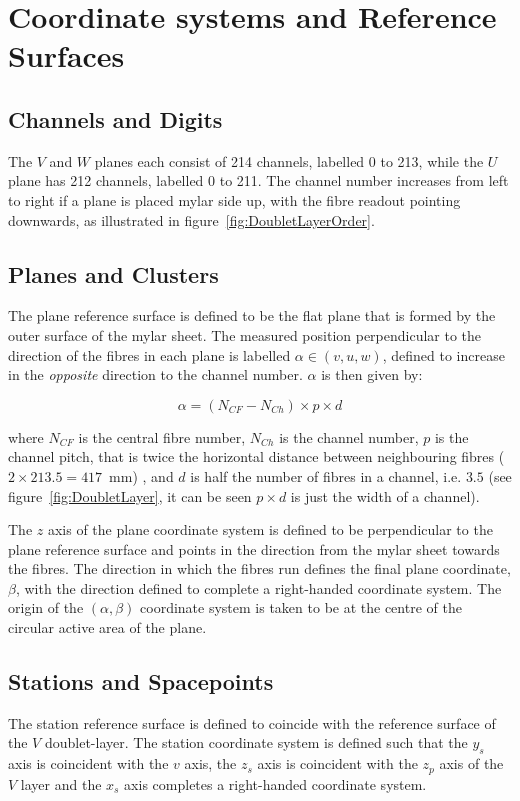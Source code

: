 \section{Coordinate systems and Reference Surfaces}
\label{sec:Coordinates}

  \subsection{Channels and Digits}
  The $V$ and $W$ planes each consist of 214 channels, labelled 0 to 213, while the $U$ plane has 212 channels, labelled 0 to 211.  The channel number increases from left to right if a plane is placed mylar side up, with the fibre readout pointing downwards, as illustrated in figure~\ref{fig:DoubletLayerOrder}.

  \subsection{Planes and Clusters}
  The plane reference surface is defined to be the flat plane that is formed by the outer surface of the mylar sheet. The measured position perpendicular to the direction of the fibres in each plane is labelled  $\alpha \in (v, u, w)$, defined to increase in the \textit{opposite} direction to the channel number. $\alpha$ is then given by:
  
  \begin{equation}
   \alpha = \left(N_{CF} - N_{Ch}\right) \times p \times d
  \end{equation}

  \noindent
  where $N_{CF}$ is the central fibre number, $N_{Ch}$ is the channel number, $p$ is the channel pitch, that is twice the horizontal distance between neighbouring fibres ($2 \times 213.5 = 417$~mm) , and $d$ is half the number of fibres in a channel, i.e. $3.5$ (see figure~\ref{fig:DoubletLayer}, it can be seen $p \times d$ is just the width of a channel).  
  
  The $z$ axis of the plane coordinate system is defined to be perpendicular to the plane reference surface and points in the direction from the mylar sheet towards the fibres. The direction in which the fibres run defines the final plane coordinate, $\beta$, with the direction defined to complete a right-handed coordinate system. The origin of the $(\alpha, \beta)$ coordinate system is taken to be at the centre of the circular active area of the plane.

  \subsection{Stations and Spacepoints}
  The station reference surface is defined to coincide with the reference surface of the $V$ doublet-layer. The station coordinate system is defined such that the $y_s$ axis is coincident with the $v$ axis, the $z_s$ axis is coincident with the $z_p$ axis of the $V$ layer and the $x_s$ axis completes a right-handed coordinate system.

